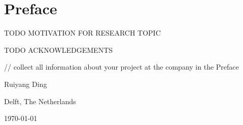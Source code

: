 \chapter*{Preface}
TODO MOTIVATION FOR RESEARCH TOPIC

\vspace{1\baselineskip}

\noindent
TODO ACKNOWLEDGEMENTS

\vspace{1\baselineskip}

// collect all information about your project at the company in the Preface


\noindent
Ruiyang Ding

\vspace{1\baselineskip}

\noindent
Delft, The Netherlands

\noindent
\today
